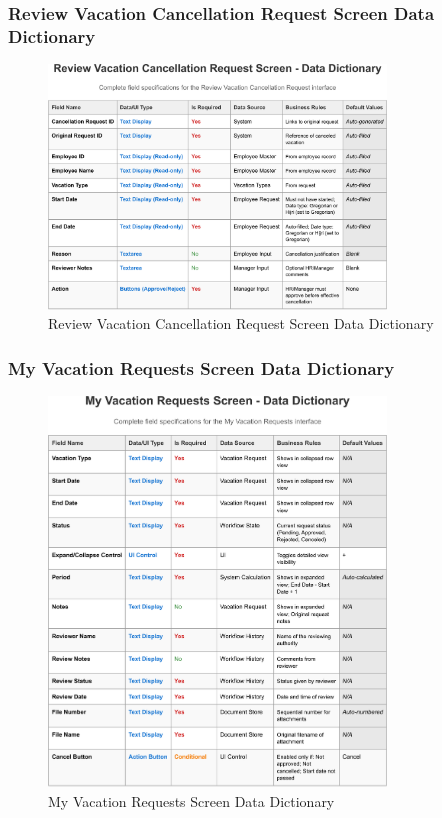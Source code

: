 \documentclass[12pt,a4paper]{article}
\begin{document}
\subsubsection{Review Vacation Cancellation Request Screen Data Dictionary}
\begin{figure}[H]
\centering
\includegraphics[width=0.8\textwidth]{Data-Dictionary/Screen-Data-Dictionaries/Review-Vacation-Cancellation-Request-Screen-Data-Dictionary/Review-Vacation-Cancellation-Request-Screen-Data-Dictionary-1.png}
\caption{Review Vacation Cancellation Request Screen Data Dictionary}
\label{fig:review-cancellation-data-dict}
\end{figure}

\subsubsection{My Vacation Requests Screen Data Dictionary}
\begin{figure}[H]
\centering
\includegraphics[width=0.8\textwidth]{Data-Dictionary/Screen-Data-Dictionaries/My-Vacation-Requests-Screen-Data-Dictionary/My-Vacation-Requests-Screen-Data-Dictionary-1.png}
\caption{My Vacation Requests Screen Data Dictionary}
\label{fig:my-vacation-requests-data-dict}
\end{figure}
\end{document}
